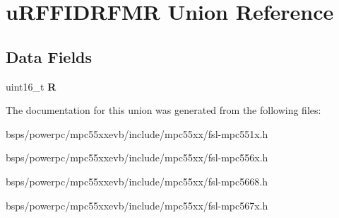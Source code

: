 \hypertarget{unionuRFFIDRFMR}{}\section{u\+R\+F\+F\+I\+D\+R\+F\+MR Union Reference}
\label{unionuRFFIDRFMR}
\subsection*{Data Fields}
\begin{DoxyCompactItemize}
\item 
\mbox{\label{unionuRFFIDRFMR_a2f57a6071151f15f190f4ed946263768}} 
uint16\+\_\+t {\bfseries R}
\end{DoxyCompactItemize}


The documentation for this union was generated from the following files\+:\begin{DoxyCompactItemize}
\item 
bsps/powerpc/mpc55xxevb/include/mpc55xx/fsl-\/mpc551x.\+h\item 
bsps/powerpc/mpc55xxevb/include/mpc55xx/fsl-\/mpc556x.\+h\item 
bsps/powerpc/mpc55xxevb/include/mpc55xx/fsl-\/mpc5668.\+h\item 
bsps/powerpc/mpc55xxevb/include/mpc55xx/fsl-\/mpc567x.\+h\end{DoxyCompactItemize}
